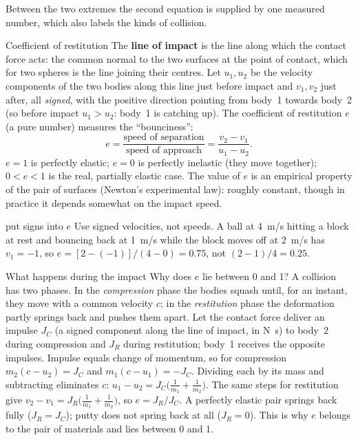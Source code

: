 \begin{figure}[htbp]
\centering
{}
\end{figure}

Between the two extremes the second equation is supplied by one measured number, which also labels the
kinds of collision.

\begin{defbox}{Coefficient of restitution}
The \textbf{line of impact} is the line along which the contact force acts: the common normal to the two
surfaces at the point of contact, which for two spheres is the line joining their centres. Let $u_1,u_2$
be the velocity components of the two bodies along this line just before impact and $v_1,v_2$ just after,
all \emph{signed}, with the positive direction pointing from body~1 towards body~2 (so before impact
$u_1>u_2$: body~1 is catching up). The
coefficient of restitution $e$ (a pure number) measures the ``bounciness'':
\[
e=\frac{\text{speed of separation}}{\text{speed of approach}}=\frac{v_2-v_1}{u_1-u_2}.
\]
$e=1$ is
perfectly elastic; $e=0$ is perfectly inelastic (they move together); $0<e<1$ is the real, partially
elastic case. The value of $e$ is an empirical property of the pair of surfaces (Newton's experimental
law): roughly constant, though in practice it depends somewhat on the impact speed.
\end{defbox}

\begin{trapbox}{put signs into $e$}
Use signed velocities, not speeds. A ball at \SI{4}{m/s} hitting a block at rest and bouncing back at
\SI{1}{m/s} while the block moves off at \SI{2}{m/s} has $v_1=-1$, so $e=[2-(-1)]/(4-0)=0.75$, not
$(2-1)/4=0.25$.
\end{trapbox}

\begin{remarkbox}{What happens during the impact}
Why does $e$ lie between 0 and 1? A collision has two phases.
 In the \emph{compression} phase the
bodies squash until, for an instant, they move with a common velocity $c$; in the \emph{restitution}
phase the deformation partly springs back and pushes them apart. Let the contact force deliver an
impulse $J_C$ (a signed component along the line of impact, in \si{N.s}) to body~2 during compression and
$J_R$ during restitution; body~1 receives the opposite impulses. Impulse equals change of momentum, so for
compression $m_2(c-u_2)=J_C$ and $m_1(c-u_1)=-J_C$. Dividing each by its mass and subtracting eliminates
$c$: $u_1-u_2=J_C\big(\tfrac1{m_1}+\tfrac1{m_2}\big)$. The same steps for restitution give
$v_2-v_1=J_R\big(\tfrac1{m_1}+\tfrac1{m_2}\big)$, so
$e=J_R/J_C$. A perfectly elastic pair springs back fully ($J_R=J_C$); putty does not spring back at all
($J_R=0$). This is why $e$ belongs to the pair of materials and lies between 0 and 1.
\end{remarkbox}

